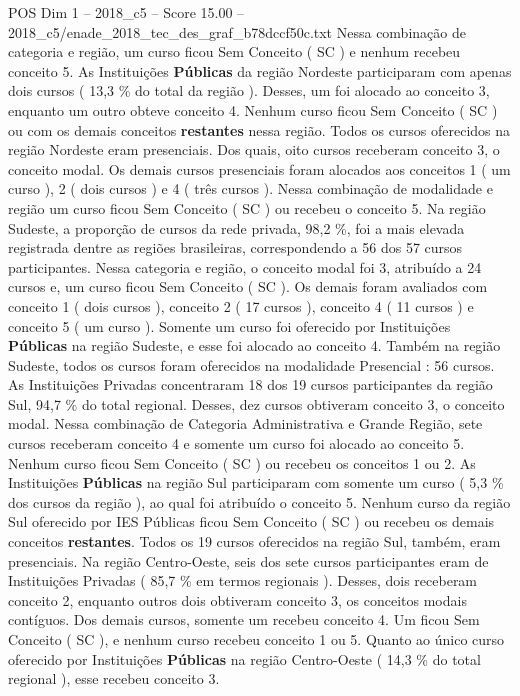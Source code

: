 \begin{textsample}{POS Dim 1 – 2018\_c5 – Score 15.00 – 2018\_c5/enade\_2018\_tec\_des\_graf\_b78dccf50c.txt}
Nessa combinação de categoria e região, um curso ficou Sem Conceito ( SC ) e nenhum recebeu conceito 5.
As Instituições \textbf{Públicas} da região Nordeste participaram com apenas dois cursos ( 13,3 \% do total da região ).
Desses, um foi alocado ao conceito 3, enquanto um outro obteve conceito 4.
Nenhum curso ficou Sem Conceito ( SC ) ou com os demais conceitos \textbf{restantes} nessa região.
Todos os cursos oferecidos na região Nordeste eram presenciais.
Dos quais, oito cursos receberam conceito 3, o conceito modal.
Os demais cursos presenciais foram alocados aos conceitos 1 ( um curso ), 2 ( dois cursos ) e 4 ( três cursos ).
Nessa combinação de modalidade e região um curso ficou Sem Conceito ( SC ) ou recebeu o conceito 5.
Na região Sudeste, a proporção de cursos da rede privada, 98,2 \%, foi a mais elevada registrada dentre as regiões brasileiras, correspondendo a 56 dos 57 cursos participantes.
Nessa categoria e região, o conceito modal foi 3, atribuído a 24 cursos e, um curso ficou Sem Conceito ( SC ).
Os demais foram avaliados com conceito 1 ( dois cursos ), conceito 2 ( 17 cursos ), conceito 4 ( 11 cursos ) e conceito 5 ( um curso ).
Somente um curso foi oferecido por Instituições \textbf{Públicas} na região Sudeste, e esse foi alocado ao conceito 4.
Também na região Sudeste, todos os cursos foram oferecidos na modalidade Presencial : 56 cursos.
As Instituições Privadas concentraram 18 dos 19 cursos participantes da região Sul, 94,7 \% do total regional.
Desses, dez cursos obtiveram conceito 3, o conceito modal.
Nessa combinação de Categoria Administrativa e Grande Região, sete cursos receberam conceito 4 e somente um curso foi alocado ao conceito 5.
Nenhum curso ficou Sem Conceito ( SC ) ou recebeu os conceitos 1 ou 2.
As Instituições \textbf{Públicas} na região Sul participaram com somente um curso ( 5,3 \% dos cursos da região ), ao qual foi atribuído o conceito 5.
Nenhum curso da região Sul oferecido por IES Públicas ficou Sem Conceito ( SC ) ou recebeu os demais conceitos \textbf{restantes}.
Todos os 19 cursos oferecidos na região Sul, também, eram presenciais.
Na região Centro-Oeste, seis dos sete cursos participantes eram de Instituições Privadas ( 85,7 \% em termos regionais ).
Desses, dois receberam conceito 2, enquanto outros dois obtiveram conceito 3, os conceitos modais contíguos.
Dos demais cursos, somente um recebeu conceito 4.
Um ficou Sem Conceito ( SC ), e nenhum curso recebeu conceito 1 ou 5.
Quanto ao único curso oferecido por Instituições \textbf{Públicas} na região Centro-Oeste ( 14,3 \% do total regional ), esse recebeu conceito 3.

\end{textsample}
